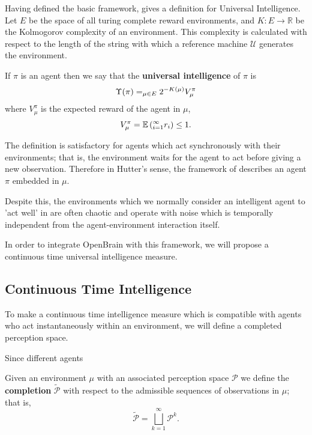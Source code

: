 Having defined the basic framework, \cite{legg2007universal} gives a definition for Universal Intelligence. Let $E$ be the space of all turing complete reward environments, and $K: E \to  \mathbb{R}$ be the Kolmogorov complexity of an environment. This complexity is calculated with respect to the length of the string with which a reference machine $\mathcal{U}$ generates the environment.
\begin{definition} \label{uim}
	If $\pi$ is an agent then we say that the \textbf{universal intelligence} of $\pi$ is
	\begin{equation} \label{eq:uim}
		\Upsilon(\pi) = \relax_{\mu \in E}2^{-K(\mu)}V_\mu^\pi
	\end{equation}
	where $V_\mu^\pi$ is the expected reward of the agent in $\mu$,
	\begin{equation} \label{eq:exprewarduim}
		V_\mu^\pi = \mathbb{E}\left(\relax_{i=1}^\infty r_i\right) \leq 1.
	\end{equation}
\end{definition}

The definition is satisfactory for agents which act synchronously with their environments; that is, the environment waits for the agent to act before giving a new observation. Therefore in Hutter's sense, the framework of \cite{legg2007universal} describes an agent $\pi$ embedded in $\mu$.

Despite this, the environments which we normally consider an intelligent agent to 'act well' in are often chaotic and operate with noise which is temporally independent from the agent-environment interaction itself. %

In order to integrate OpenBrain with this framework, we will propose a continuous time universal intelligence measure.

\subsection{Continuous Time Intelligence}

To make a continuous time intelligence measure which is compatible with agents who act instantaneously within an environment, we will define a completed perception space.

Since different agents 

\begin{definition}
	Given an environment $\mu$ with an associated 
	perception space $\mathcal{P}$ we define the
	\textbf{completion} $\tilde{\mathcal{P}}$ with respect to the admissible sequences of observations in $\mu$; that is,
	\begin{equation}
		\tilde{\mathcal{P}} = \bigsqcup_{k=1}^\infty \mathcal{P}^k.
	\end{equation}
\end{definition}
